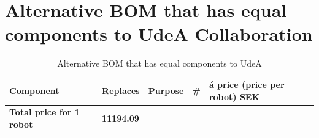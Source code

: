 \documentclass[a4paper,8pt]{article}
\begin{document}

  \section{Alternative BOM that has equal components to UdeA
    Collaboration}

  \begin{small}
    \begin{longtable}{|p{3cm}|p{3cm}|p{3cm}|p{1cm}|p{3cm}| }
      \caption{Alternative BOM that has equal components to UdeA} \\ \hline 
      \rowcolor{gray!50} \textbf{Component} & \textbf{Replaces} & \textbf{Purpose} & \textbf{\#} & \textbf{á price (price per robot) SEK}\\ \endhead \hline

      \rowcolor{gray!50} \textbf{Total price for 1 robot} & \textbf{11194.09} \endlastfoot \hline


\end{longtable}
\end{small}
\end{document}
